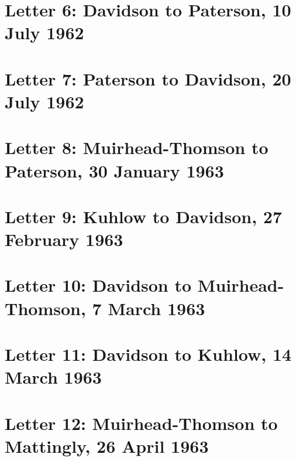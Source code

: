 \documentclass[a4paper,11pt,abstracton,hidelinks]{scrartcl}
\begin{document}
\section{Letter 6: Davidson to Paterson, 10 July 1962}


\section{Letter 7: Paterson to Davidson, 20 July 1962}


\section{Letter 8: Muirhead-Thomson to Paterson, 30 January 1963}


\section{Letter 9: Kuhlow to Davidson, 27 February 1963}


\section{Letter 10: Davidson to Muirhead-Thomson, 7 March 1963}


\section{Letter 11: Davidson to Kuhlow, 14 March 1963}


\section{Letter 12: Muirhead-Thomson to Mattingly, 26 April 1963}

\end{document}
